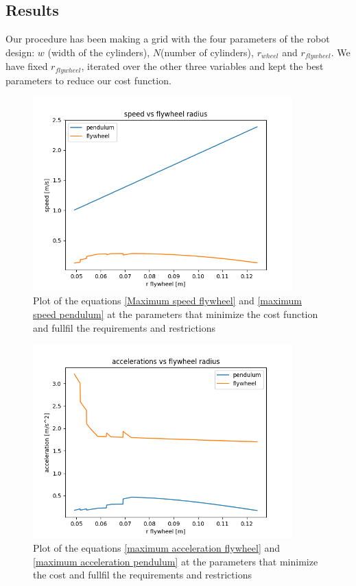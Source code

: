 \subsection{Results} \label{sec: parameters results}
Our procedure has been making a grid with the four parameters of the robot 
design: $w$ (width of the cylinders), $N$(number of cylinders), $r_{wheel}$ and $r_{flywheel}$.
We have fixed $r_{flywheel}$, iterated over the other three variables and kept the best
parameters to reduce our cost function.


\begin{figure}[H]
	\centering
	\includegraphics[width=10cm]{img/optimization/speed.png}
	\caption{Plot of the equations \ref{Maximum speed flywheel} and \ref{maximum speed pendulum} at the parameters that minimize the cost function and fullfil the requirements and restrictions}
	\label{fig:Speed plot}
\end{figure}

\begin{figure}[H]
	\centering
	\includegraphics[width=10cm]{img/optimization/acceleration.png}
	\caption{Plot of the equations \ref{maximum acceleration flywheel} and \ref{maximum acceleration pendulum} at the parameters that minimize the cost and fullfil the requirements and restrictions}
	\label{fig:Speed plot}
\end{figure}

